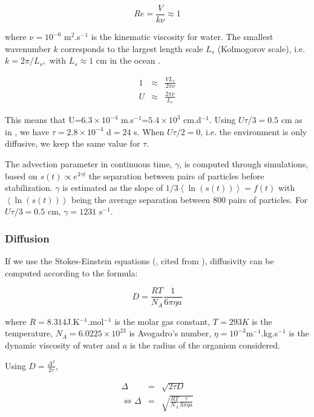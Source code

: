\documentclass[english]{article}
\begin{document}
\[
Re=\frac{V}{k\nu}\approx1
\]

where $\nu=10^{-6}$ m$^{2}$.s$^{-1}$ is the kinematic viscosity
for water. The smallest wavenumber $k$ corresponds to the largest
length scale $L_{s}$ (Kolmogorov scale), i.e. $k=2\pi/L_{s},$ with
$L_{s}\approx1$ cm in the ocean \citep{barton_impact_2014}.

\begin{eqnarray*}
1 & \approx & \frac{VL_{s}}{2\pi\nu}\\
U & \approx & \frac{2\pi\nu}{L_{s}}
\end{eqnarray*}

This means that U=$6.3\times10^{-4}$ m.s$^{-1}$=$5.4\times10^{3}$
cm.d$^{-1}$. Using $U\tau/3=0.5$ cm as in \citet{young_reproductive_2001},
we have $\tau=2.8\times10^{-4}$ d$=24$ s. When $U\tau/2=0$, i.e.
the environment is only diffusive, we keep the same value for $\tau$.

The advection parameter in continuous time, $\gamma$, is computed
through simulations, based on $s(t)\varpropto e^{3\gamma t}$ the
separation between pairs of particles before stabilization. $\gamma$
is estimated as the slope of $1/3\left\langle \ln(s(t))\right\rangle =f(t)$
with $\left\langle \ln(s(t))\right\rangle $ being the average separation
between 800 pairs of particles. For $U\tau/3=0.5$ cm, $\gamma=1231$
s$^{-1}$.

\subsubsection*{Diffusion}

If we use the Stokes-Einstein equations (\citealp{einstein1905molekularkinetischen},
cited from \citealp{dusenbery_2009}), diffusivity can be computed
according to the formula:

\begin{equation}
D=\frac{RT}{N_{A}}\frac{1}{6\pi\eta a}
\end{equation}

where $R=8.314$J.K$^{-1}$.mol$^{-1}$ is the molar gas constant,
$T=293K$ is the temperature, $N_{A}=6.0225\times10^{23}$ is Avogadro's
number, $\eta=10^{-3}$m$^{-1}.$kg.s$^{-1}$ is the dynamic viscosity
of water and $a$ is the radius of the organism considered.

Using $D=\frac{\Delta^{2}}{2\tau}$,

\begin{eqnarray*}
\Delta & = & \sqrt{2\tau D}\\
\Leftrightarrow\Delta & = & \sqrt{\frac{RT}{N_{A}}\frac{\tau}{3\pi\eta a}}
\end{eqnarray*}
\end{document}
